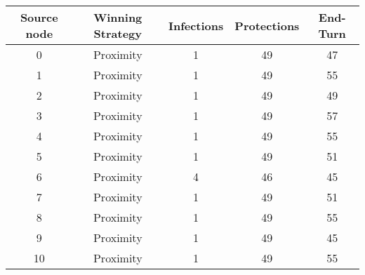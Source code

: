 \documentclass[results.tex]{subfiles}
\begin{document}
    \begin{center}
        \begin{tabular}{| c || c | c | c | c |}
            \hline
            {\bfseries Source node} & {\bfseries Winning Strategy} & {\bfseries Infections} & {\bfseries Protections}
            & {\bfseries End-Turn}
            \\  %
            \hline\hline
            0                       & Proximity                    & 1                      & 49                      & 47                   \\
            \hline
            1                       & Proximity                    & 1                      & 49                      & 55                   \\
            \hline
            2                       & Proximity                    & 1                      & 49                      & 49                   \\
            \hline
            3                       & Proximity                    & 1                      & 49                      & 57                   \\
            \hline
            4                       & Proximity                    & 1                      & 49                      & 55                   \\
            \hline
            5                       & Proximity                    & 1                      & 49                      & 51                   \\
            \hline
            6                       & Proximity                    & 4                      & 46                      & 45                   \\
            \hline
            7                       & Proximity                    & 1                      & 49                      & 51                   \\
            \hline
            8                       & Proximity                    & 1                      & 49                      & 55                   \\
            \hline
            9                       & Proximity                    & 1                      & 49                      & 45                   \\
            \hline
            10                      & Proximity                    & 1                      & 49                      & 55                   \\

\end{tabular}
\end{center}
\end{document}

